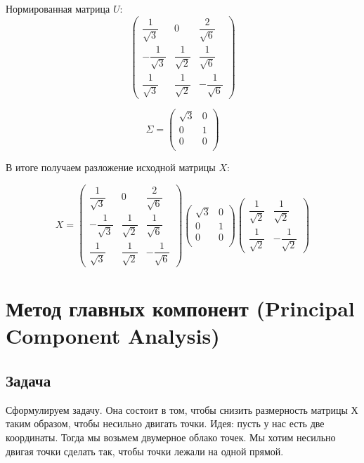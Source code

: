 \documentclass[12pt]{article} %
\theoremstyle{definition} %
\begin{document}
Нормированная матрица $U$:
\[
\begin{pmatrix}
\dfrac{1}{\sqrt{3}} & 0 & \dfrac{2}{\sqrt{6}} \\
-\dfrac{1}{\sqrt{3}} & \dfrac{1}{\sqrt{2}} & \dfrac{1}{\sqrt{6}} \\
\dfrac{1}{\sqrt{3}} & \dfrac{1}{\sqrt{2}} & -\dfrac{1}{\sqrt{6}}
\end{pmatrix}
\]

\[
\Sigma = \begin{pmatrix}
\sqrt{3} & 0 \\
0 & 1 \\
0 & 0 \\
\end{pmatrix}
\]

В итоге получаем разложение исходной матрицы $X$:

\[
X= \begin{pmatrix}
\dfrac{1}{\sqrt{3}} & 0 & \dfrac{2}{\sqrt{6}} \\
-\dfrac{1}{\sqrt{3}} & \dfrac{1}{\sqrt{2}} & \dfrac{1}{\sqrt{6}} \\
\dfrac{1}{\sqrt{3}} & \dfrac{1}{\sqrt{2}} & -\dfrac{1}{\sqrt{6}}
\end{pmatrix}  \begin{pmatrix}
\sqrt{3} & 0 \\
0 & 1 \\
0 & 0 \\
\end{pmatrix}
\begin{pmatrix}
\dfrac{1}{\sqrt{2}} & \dfrac{1}{\sqrt{2}} \\
\dfrac{1}{\sqrt{2}} & -\dfrac{1}{\sqrt{2}}
\end{pmatrix}
\]

\section{Метод главных компонент (Principal Component Analysis)}
\subsection{Задача}
Сформулируем задачу. Она состоит в том, чтобы снизить размерность матрицы $Х$ таким образом, чтобы несильно двигать точки.
Идея: пусть у нас есть две координаты. Тогда мы возьмем двумерное облако точек. Мы хотим несильно двигая точки сделать так, чтобы точки лежали на одной прямой.

\end{document}
